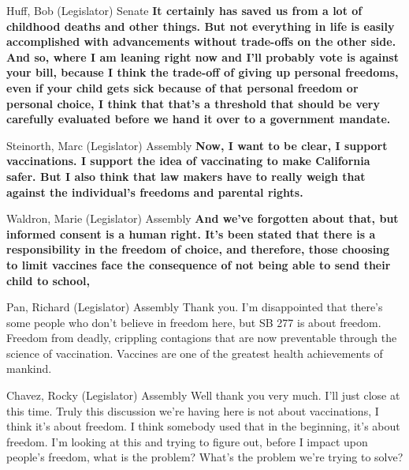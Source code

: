 \begin{result}{8.933851997852667}{Huff, Bob (Legislator) Senate}
\textbf{It certainly has saved us from a lot of childhood deaths and other things. But not everything in life is easily accomplished with advancements without trade-offs on the other side. And so, where I am leaning right now and I'll probably vote is against your bill, because I think the trade-off of giving up personal freedoms, even if your child gets sick because of that personal freedom or personal choice, I think that that's a threshold that should be very carefully evaluated before we hand it over to a government mandate.
}\end{result}

\begin{result}{8.197005128910773}{Steinorth, Marc (Legislator) Assembly}
\textbf{Now, I want to be clear, I support vaccinations. I support the idea of vaccinating to make California safer. But I also think that law makers have to really weigh that against the individual's freedoms and parental rights.
}\end{result}

\begin{result}{7.276205318374071}{Waldron, Marie (Legislator) Assembly}
\textbf{And we've forgotten about that, but informed consent is a human right. It's been stated that there is a responsibility in the freedom of choice, and therefore, those choosing to limit vaccines face the consequence of not being able to send their child to school,
}\end{result}

\begin{result}{6.269083798264194}{Pan, Richard (Legislator) Assembly}
Thank you. I'm disappointed that there's some people who don't believe in freedom here, but SB 277 is about freedom. Freedom from deadly, crippling contagions that are now preventable through the science of vaccination. Vaccines are one of the greatest health achievements of mankind.
\end{result}

\begin{result}{5.840766769352013}{Chavez, Rocky (Legislator) Assembly}
Well thank you very much. I'll just close at this time. Truly this discussion we're having here is not about vaccinations, I think it's about freedom. I think somebody used that in the beginning, it's about freedom. I'm looking at this and trying to figure out, before I impact upon people's freedom, what is the problem? What's the problem we're trying to solve?
\end{result}

